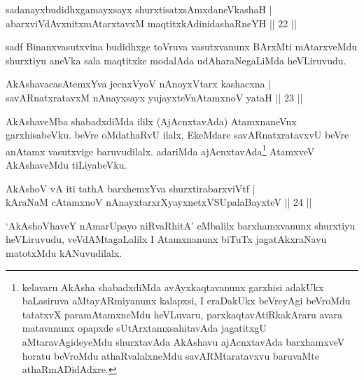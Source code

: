 
\begin{shl}
sadanayxbudidhxgamayxsayx shurxtisatxsAmxdaneVkashaH |\\
abarxviVdAvxnitxmAtarxtavxM maqtitxkAdinidashaRneYH \hfill || 22 ||
\end{shl}

\begin{artha}
sadf Binanxvasutxvina budidhxge toVruva vasutxvanunx BArxMti mAtarxveMdu shurxtiyu aneVka sala maqtitxke modalAda udAharaNegaLiMda heVLiruvudu.
\end{artha}


\begin{shl}
AkAshavacasA\s \s temxYva jecnxVyoV nAnoyxV\s tarx kashacxna |\\
savARnatxratavxM nAnayxsayx yujayxteV\s nAtamxnoV yataH \hfill || 23 ||
\end{shl}

\begin{artha}
AkAshaveMba shabadxdiMda ililx (AjAcnxtavAda) AtamxnaneVnx garxhisabeVku. beVre oMdathaRvU ilalx, EkeMdare savARnatxratavxvU beVre anAtamx vasutxvige baruvudilalx. adariMda ajAcnxtavAda\footnote[1]{kelavaru AkAsha shabadxdiMda avAyxkaqtavanunx garxhisi adakUkx baLasiruva aMtayARmiyanunx kalapxsi, I eraDakUkx beVreyAgi beVroMdu tatatxvX paramAtamxneMdu heVLuvaru, parxkaqtavAtiRkakAraru avara matavanunx opapxde sUtArxtamxsahitavAda jagatitxgU aMtaravAgideyeMdu shurxtavAda AkAshavu ajAcnxtavAda barxhamxveV horatu beVroMdu athaRvalalxneMdu savARMtaratavxvu baruvaMte athaRmADidAdxre.} AtamxveV AkAshaveMdu tiLiyabeVku.
\end{artha}


\begin{shl}
AkAshoV vA iti tathA barxhemxYva shurxtirabarxviVtf |\\
kAraNaM cA\s \s tamxnoV nAnayxtarxrXyayxnetxVSUpalaBayxteV \hfill || 24 ||
\end{shl}

\begin{artha}
`AkAshoVhaveY nAmarUpayo niRvaRhitA' eMbalilx barxhamxvanunx shurxtiyu heVLiruvudu, veVdAMtagaLalilx I Atamxnanunx biTuTx jagatAkxraNavu matotxMdu kANuvudilalx.
\end{artha}

